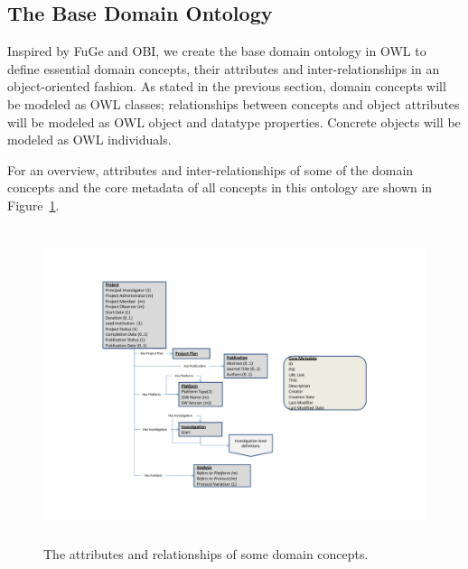 \documentclass{elsarticle}
\begin{document}

\subsection{The Base Domain Ontology}\label{sec:podd_ont}
Inspired by FuGe and OBI, we create the base domain ontology
in OWL to define essential domain concepts, their attributes
and inter-relationships in an object-oriented fashion.
As stated in the previous section,
domain concepts will be modeled as OWL classes; relationships
between concepts and object attributes will be modeled as OWL object and
datatype properties. Concrete objects will be modeled as OWL
individuals.

For an overview, attributes and inter-relationships of some
of the domain concepts and the core metadata of all concepts
in this ontology are shown in Figure~\ref{fig:model}.

\begin{figure}[htb]
\centering
\includegraphics[trim = 54mm 20mm 64mm 30mm, clip,height=92mm]{model.pdf}
\vspace{-16pt} \caption{The attributes and relationships of some
domain concepts.}\label{fig:model}
\end{figure}
\end{document}

